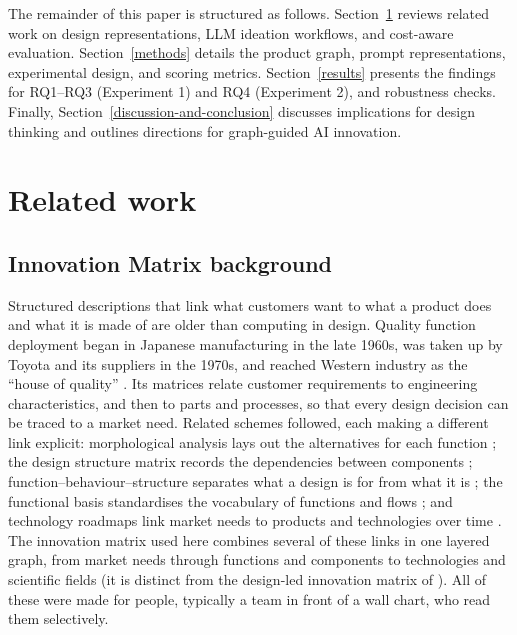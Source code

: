 The remainder of this paper is structured as follows. Section~\ref{related-work} reviews related work on design representations, LLM ideation workflows, and cost-aware evaluation. Section~\ref{methods} details the product graph, prompt representations, experimental design, and scoring metrics. Section~\ref{results} presents the findings for RQ1--RQ3 (Experiment 1) and RQ4 (Experiment 2), and robustness checks. Finally, Section~\ref{discussion-and-conclusion} discusses implications for design thinking and outlines directions for graph-guided AI innovation.

\section{Related work}
\label{related-work}

\subsection{Innovation Matrix background}

Structured descriptions that link what customers want to what a product does and what it is made of are older than computing in design. Quality function deployment began in Japanese manufacturing in the late 1960s, was taken up by Toyota and its suppliers in the 1970s, and reached Western industry as the ``house of quality'' \citep{ed2024,Hauser1988,Chan2002}. Its matrices relate customer requirements to engineering characteristics, and then to parts and processes, so that every design decision can be traced to a market need. Related schemes followed, each making a different link explicit: morphological analysis lays out the alternatives for each function \citep{Zwicky1967,Ritchey2006,Ritchey2018}; the design structure matrix records the dependencies between components \citep{Steward1981,Browning2001,Eppinger2012}; function--behaviour--structure separates what a design is for from what it is \citep{Gero1990,Gero2004}; the functional basis standardises the vocabulary of functions and flows \citep{Stone2000,Hirtz2002}; and technology roadmaps link market needs to products and technologies over time \citep{Phaal2004}. The innovation matrix used here \citep{berengueres2014} combines several of these links in one layered graph, from market needs through functions and components to technologies and scientific fields (it is distinct from the design-led innovation matrix of \citet{Kyffin2009}). All of these were made for people, typically a team in front of a wall chart, who read them selectively.

